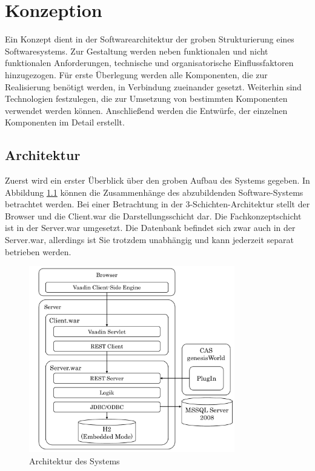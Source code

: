 
\chapter{Konzeption}
\label{ch:Konzeption}

Ein Konzept dient in der Softwarearchitektur der groben Strukturierung eines Softwaresystems. Zur Gestaltung werden neben funktionalen und nicht funktionalen Anforderungen, technische und organisatorische Einflussfaktoren hinzugezogen. Für erste Überlegung werden alle Komponenten, die zur Realisierung benötigt werden, in Verbindung zueinander gesetzt. Weiterhin sind Technologien festzulegen, die zur Umsetzung von bestimmten Komponenten verwendet werden können. Anschließend werden die Entwürfe, der einzelnen Komponenten im Detail erstellt.  

\section{Architektur}

Zuerst wird ein erster Überblick über den groben Aufbau des Systems gegeben. In Abbildung \ref{konzept_architektur} können die Zusammenhänge des abzubildenden Software-Systems betrachtet werden. Bei einer Betrachtung in der 3-Schichten-Architektur stellt der Browser und die Client.war die Darstellungsschicht dar. Die Fachkonzeptschicht ist in der Server.war umgesetzt. Die Datenbank befindet sich zwar auch in der Server.war, allerdings ist Sie trotzdem unabhängig und kann jederzeit separat betrieben werden.

\begin{figure}[htbp]
\centering
  \includegraphics[width=0.8\textwidth, width=0.8\textwidth]{pics/Konzept_architektur.pdf}
\caption{Architektur des Systems}
\label{konzept_architektur}
\end{figure} 

